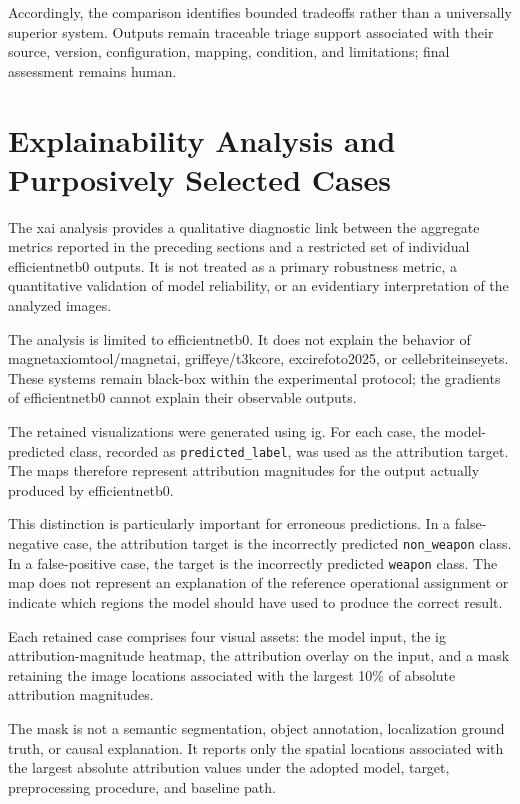 Accordingly, the comparison identifies bounded tradeoffs rather than a
universally superior system. Outputs remain traceable triage support associated
with their source, version, configuration, mapping, condition, and limitations;
final assessment remains human.
\section{Explainability Analysis and Purposively Selected Cases}
\label{sec:results-explainability}

The \gls{xai} analysis provides a qualitative diagnostic link between the
aggregate metrics reported in the preceding sections and a restricted set of
individual \gls{efficientnetb0} outputs. It is not treated as a primary robustness
metric, a quantitative validation of model reliability, or an evidentiary
interpretation of the analyzed images.

The analysis is limited to \gls{efficientnetb0}. It does not
explain the behavior of \gls{magnetaxiomtool}/\gls{magnetai},
\gls{griffeye}/\gls{t3kcore},
\gls{excirefoto2025}, or
\gls{cellebriteinseyets}. These systems remain black-box within the
experimental protocol; the gradients of \gls{efficientnetb0} cannot explain
their observable outputs.

The retained visualizations were generated using \gls{ig}. For each case, the
model-predicted class, recorded as \texttt{predicted\_label}, was used as the
attribution target. The maps therefore represent attribution magnitudes for the
output actually produced by \gls{efficientnetb0}.

This distinction is particularly important for erroneous predictions. In a
false-negative case, the attribution target is the incorrectly predicted
\texttt{non\_weapon} class. In a false-positive case, the target is the
incorrectly predicted \texttt{weapon} class. The map does not represent an
explanation of the reference operational assignment or indicate which regions
the model should have used to produce the correct result.

Each retained case comprises four visual assets: the model input, the
\gls{ig} attribution-magnitude heatmap, the attribution overlay on the input,
and a mask retaining the image locations associated with the largest 10\% of
absolute attribution magnitudes.

The mask is not a semantic segmentation, object annotation, localization
ground truth, or causal explanation. It reports only the spatial locations
associated with the largest absolute attribution values under the adopted
model, target, preprocessing procedure, and baseline path.


